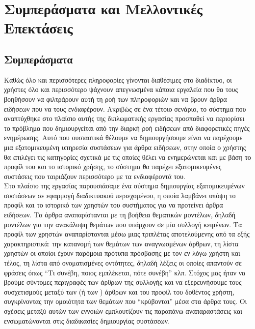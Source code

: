 \chapter{Συμπεράσματα και Μελλοντικές Επεκτάσεις}

\section{Συμπεράσματα}

Καθώς όλο και περισσότερες πληροφορίες γίνονται διαθέσιμες στο διαδίκτυο, οι
χρήστες όλο και περισσότερο ψάχνουν απεγνωσμένα κάποια εργαλεία που θα τους
βοηθήσουν να φιλτράρουν αυτή τη ροή των πληροφοριών και να βρουν άρθρα
ειδήσεων που να τους ενδιαφέρουν. Ακριβώς σε ένα τέτοιο σενάριο, το σύστημα που
αναπτύχθηκε στο πλαίσιο αυτής της διπλωματικής εργασίας προσπαθεί να περιορίσει το πρόβλημα που
δημιουργείται από την διαρκή ροή ειδήσεων από διαφορετικές πηγές ενημέρωσης.
Αυτό που ουσιαστικά θέλουμε να δημιουργήσουμε είναι να παρέχουμε μια
εξατομικευμένη υπηρεσία συστάσεων για άρθρα ειδήσεων, στην οποία ο χρήστης 
θα επιλέγει τις κατηγορίες σχετικά με τις οποίες θέλει να ενημερώνεται και με βάση 
το προφίλ του και το ιστορικό χρήσης, το σύστημα θα παρέχει εξατομικευμένες συστάσεις 
που ταιριάζουν περισσότερο με τα ενδιαφέροντά του. \\

Στο πλαίσιο της εργασίας παρουσιάσαμε ένα σύστημα δημιουργίας εξατομικευμένων συστάσεων 
σε εφαρμογή διαδικτυακού περιεχομένου, 
η οποία λαμβάνει υπόψη το προφίλ και το ιστορικό των χρηστών του συστήματος για να 
προτείνει άρθρα ειδήσεων. 
Τα άρθρα αναπαρίστανται με τη βοήθεια θεματικών μοντέλων, 
δηλαδή μοντέλων για την ανακάλυψη θεμάτων που υπάρχουν σε μία συλλογή κειμένων. 
Τα προφίλ των χρηστών αναπαρίστανται μέσω μιας τριπλέτας αποτελούμενης από 
τα εξής χαρακτηριστικά: την κατανομή των θεμάτων των αναγνωσμένων άρθρων, 
τη λίστα χρηστών οι οποίοι έχουν παρόμοια πρότυπα πρόσβασης με τον εν λόγω χρήστη και 
τέλος, τη λίστα από ονοματισμένες οντότητες, δηλαδή λέξεις οι οποίες απαντούν σε φράσεις όπως 
``Τι συνέβη, ποιος εμπλέκεται, πότε συνέβη'' κλπ. 
Στόχος μας ήταν να βρούμε σύντομες περιγραφές των άρθρων της συλλογής και 
να εξερευνήσουμε τους συσχετισμούς μεταξύ των {} (ή
των {}) άρθρων και του προφίλ του δοθέντος χρήστη, 
συγκρίνοντας την ομοιότητα των θεμάτων που “κρύβονται” μέσα στα άρθρα τους.
Οι σχέσεις μεταξύ αυτών των εννοιών εμπλουτίζουν τις παραπάνω αναπαραστάσεις 
και ενσωματώνονται στις διαδικασίες δημιουργίας συστάσεων. \\

